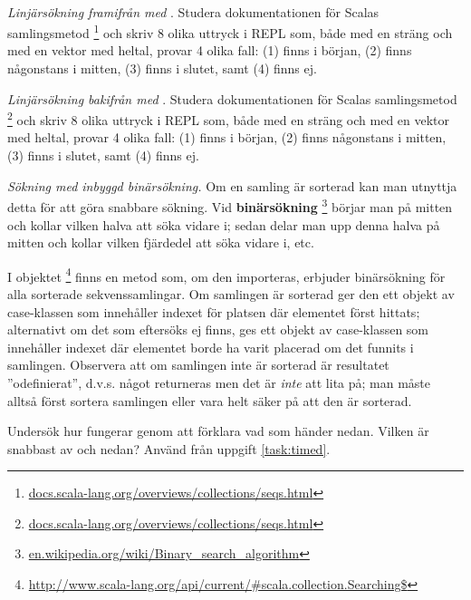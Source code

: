 \QUESTBEGIN

\Task  \what~

\Subtask \emph{Linjärsökning framifrån med }. Studera dokumentationen för Scalas samlingsmetod \footnote{\href{http://docs.scala-lang.org/overviews/collections/seqs.html}{docs.scala-lang.org/overviews/collections/seqs.html}} och skriv 8 olika uttryck i REPL som, både med en sträng och med en vektor med heltal, provar 4 olika fall: (1) finns i början, (2) finns någonstans i mitten, (3) finns i slutet, samt (4) finns ej.

\Subtask \emph{Linjärsökning bakifrån med }. Studera dokumentationen för Scalas samlingsmetod \footnote{\href{http://docs.scala-lang.org/overviews/collections/seqs.html}{docs.scala-lang.org/overviews/collections/seqs.html}} och skriv 8 olika uttryck i REPL som, både med en sträng och med en vektor med heltal, provar 4 olika fall: (1) finns i början, (2) finns någonstans i mitten, (3) finns i slutet, samt (4) finns ej.

\Subtask \emph{Sökning med inbyggd binärsökning.} Om en samling är sorterad kan man utnyttja detta för att göra snabbare sökning. Vid \textbf{binärsökning} \footnote{\label{footnote:binarysearch}\href{https://en.wikipedia.org/wiki/Binary_search_algorithm}{en.wikipedia.org/wiki/Binary\_search\_algorithm}} börjar man på mitten och kollar vilken halva att  söka vidare i; sedan delar man upp denna halva på mitten och kollar vilken fjärdedel att söka vidare i, etc.

I objektet \footnote{\href{http://www.scala-lang.org/api/current/\#scala.collection.Searching\$}{http://www.scala-lang.org/api/current/\#scala.collection.Searching\$}} finns en metod  som, om den importeras, erbjuder binärsökning för alla sorterade sekvenssamlingar. Om samlingen är sorterad ger den ett objekt av case-klassen  som innehåller indexet för platsen där elementet först hittats; alternativt om det som eftersöks ej finns, ges ett objekt av case-klassen  som innehåller indexet där elementet borde ha varit placerad om det funnits i samlingen. Observera att om samlingen inte är sorterad är resultatet ''odefinierat'', d.v.s. något returneras men det är \emph{inte} att lita på; man måste alltså först sortera samlingen eller vara helt säker på att den är sorterad.

Undersök hur  fungerar genom att förklara vad som händer nedan. Vilken är snabbast av  och  nedan? Använd  från uppgift \ref{task:timed}.


